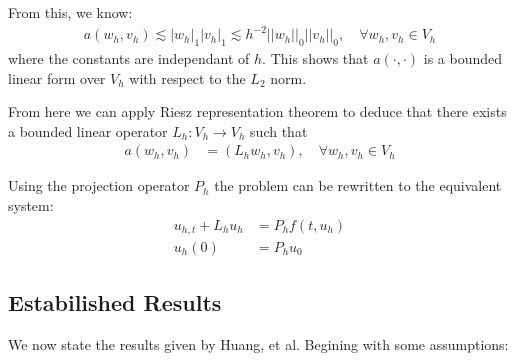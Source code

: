 From this, we know:
\begin{align}
    a(w_h, v_h) \lesssim |w_h|_1|v_h|_1 \lesssim h^{-2} ||w_h||_0||v_h||_0, \quad \forall w_h, v_h \in V_h \label{bilinear}
\end{align}
where the constants are independant of $h$.
This shows that $a(\cdot,\cdot)$ is a bounded linear form over $V_h$ with respect to the $L_2$ norm.

From here we can apply Riesz representation theorem to deduce that there exists a bounded linear operator $L_h:V_h\rightarrow V_h$ such that
\begin{align*}
    a(w_h, v_h) &= (L_h w_h, v_h), \quad \forall w_h, v_h \in V_h
\end{align*}

Using the projection operator $P_h$ the problem can be rewritten to the equivalent system:
\begin{align*}
    u_{h,t} + L_hu_h &= P_hf(t,u_h)\\
    u_h(0) &= P_hu_0
\end{align*}

\subsection{Estabilished Results}
We now state the results given by Huang, et al\cite{Huang2022}.
Begining with some assumptions:

